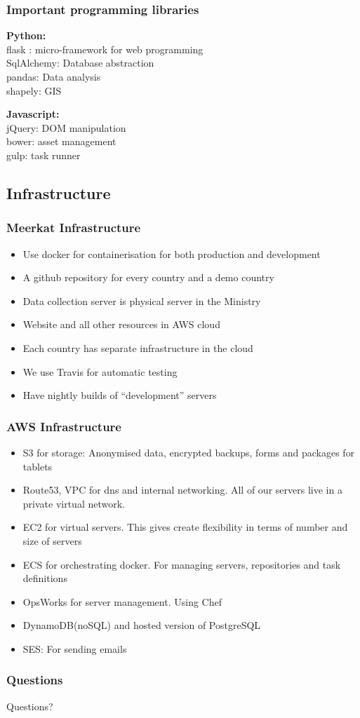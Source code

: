 \documentclass{beamer}
\begin{document}
\begin{frame}
  \frametitle{Important programming libraries}
  {\bf Python:} \\
  flask : micro-framework for web programming \\
  SqlAlchemy: Database abstraction \\
  pandas: Data analysis \\
  shapely: GIS \\

  \vspace{10pt}

  {\bf Javascript:} \\
  jQuery: DOM manipulation \\
  bower: asset management \\
  gulp: task runner \\
  
\end{frame}

\subsection{Infrastructure}
\begin{frame}
  \frametitle{Meerkat Infrastructure}
  \begin{itemize}
  \item Use docker for containerisation for both production and development
  \item A github repository for every country and a demo country
  \item Data collection server is physical server in the Ministry
  \item Website and all other resources in AWS cloud
  \item Each country has separate infrastructure in the cloud
  \item We use Travis for automatic testing
  \item Have nightly builds of ``development'' servers
  \end{itemize}
\end{frame}

\begin{frame}
  \frametitle{AWS Infrastructure}
  \begin{itemize}
  \item S3 for storage: Anonymised data, encrypted backups, forms and packages for tablets
  \item Route53, VPC for dns and internal networking. All of our servers live in a private virtual network.
  \item EC2 for virtual servers. This gives create flexibility in terms of number and size of servers
  \item ECS for orchestrating docker. For managing servers, repositories and task definitions
  \item OpsWorks for server management. Using Chef
  \item DynamoDB(noSQL) and hosted version of PostgreSQL 
  \item SES: For sending emails
  \end{itemize}
\end{frame}


\begin{frame}
  \frametitle{Questions}
  \Huge Questions?
\end{frame}
\end{document}
